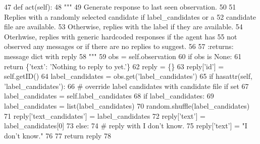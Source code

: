 \begin{DoxyCode}
47     \textcolor{keyword}{def }act(self):
48         \textcolor{stringliteral}{"""}
49 \textcolor{stringliteral}{        Generate response to last seen observation.}
50 \textcolor{stringliteral}{}
51 \textcolor{stringliteral}{        Replies with a randomly selected candidate if label\_candidates or a}
52 \textcolor{stringliteral}{        candidate file are available.}
53 \textcolor{stringliteral}{        Otherwise, replies with the label if they are available.}
54 \textcolor{stringliteral}{        Oterhwise, replies with generic hardcoded responses if the agent has}
55 \textcolor{stringliteral}{        not observed any messages or if there are no replies to suggest.}
56 \textcolor{stringliteral}{}
57 \textcolor{stringliteral}{        :returns: message dict with reply}
58 \textcolor{stringliteral}{        """}
59         obs = self.observation
60         \textcolor{keywordflow}{if} obs \textcolor{keywordflow}{is} \textcolor{keywordtype}{None}:
61             \textcolor{keywordflow}{return} \{\textcolor{stringliteral}{'text'}: \textcolor{stringliteral}{'Nothing to reply to yet.'}\}
62         reply = \{\}
63         reply[\textcolor{stringliteral}{'id'}] = self.getID()
64         label\_candidates = obs.get(\textcolor{stringliteral}{'label\_candidates'})
65         \textcolor{keywordflow}{if} hasattr(self, \textcolor{stringliteral}{'label\_candidates'}):
66             \textcolor{comment}{# override label candidates with candidate file if set}
67             label\_candidates = self.label\_candidates
68         \textcolor{keywordflow}{if} label\_candidates:
69             label\_candidates = list(label\_candidates)
70             random.shuffle(label\_candidates)
71             reply[\textcolor{stringliteral}{'text\_candidates'}] = label\_candidates
72             reply[\textcolor{stringliteral}{'text'}] = label\_candidates[0]
73         \textcolor{keywordflow}{else}:
74             \textcolor{comment}{# reply with I don't know.}
75             reply[\textcolor{stringliteral}{'text'}] = \textcolor{stringliteral}{"I don't know."}
76 
77         \textcolor{keywordflow}{return} reply
78 \end{DoxyCode}
\mbox{\label{classparlai_1_1agents_1_1random__candidate_1_1random__candidate_1_1RandomCandidateAgent_adf32b766729393efc5fbdffee363f75a}} 
